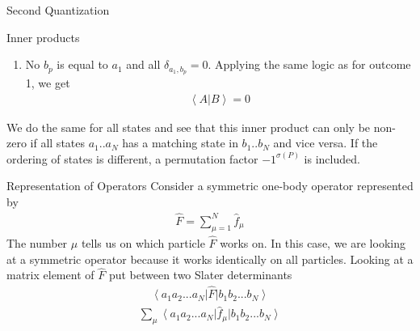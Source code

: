 \documentclass[twoside,english]{uiofysmaster}
\begin{document}
\begin{chapter}{Second Quantization}
\begin{section}{Inner products}
\begin{enumerate}
\begin{align}
			\end{align}
			This will now give us a new and shorter inner product
			\begin{align}
				\left< A | B \right> = \left< 0 \right| \hat a_N ... \hat a_2 \hat b_1^\dagger... \hat b_{p-1}^\dagger \hat b_{p+1}^\dagger ... \hat b_N^\dagger \left| 0 \right>(-1)^{p-1} - \left< 0 \right| \hat a_N ... \hat a_2 \hat b_1^\dagger \hat b_2^\dagger ... \hat b_N^\dagger \hat a_1  \left| 0 \right>
			\end{align}
			Where the last term will vanish because of $\hat a_1 \left| 0 \right> = 0$. Notice the sign factor coming from $(-1)^{p-1}$. This is due to interchanging creation operators when moving $\hat b_p^\dagger$ from position $p$ and $(p-1)$ steps to the left before using (\ref{InnerProduct1}).  
			\item No $b_p$ is equal to $a_1$ and all $\delta_{a_1, b_p} = 0$. Applying the same logic as for outcome 1, we get
			\begin{align}
				\left< A | B \right> = 0
			\end{align}
		\end{enumerate}
		We do the same for all states and see that this inner product can only be non-zero if all states $a_1 .. a_N$ has a matching state in $b_1 .. b_N$ and vice versa. If the ordering of states is different, a permutation factor $-1^{\sigma(P)}$ is included. 
	\end{section}

	\begin{section}{Representation of Operators}
		Consider a symmetric one-body operator represented by
		\begin{align}
			\hat F = \sum_{\mu = 1}^N \hat f_\mu 
		\end{align}
		The number $\mu$ tells us on which particle $\hat F$ works on. In this case, we are looking at a symmetric operator because it works identically on all particles. Looking at a matrix element of $\hat F$ put between two Slater determinants
		\begin{align}
			\left< a_1 a_2 ... a_N \right| \hat F \left| b_1 b_2 ... b_N \right> 
		\end{align}
		\begin{align}
			\sum_\mu \left< a_1 a_2 ... a_N \right| \hat f_\mu \left| b_1 b_2 ... b_N \right> 
		\end{align}


\end{section}
\end{chapter}
\end{document}
